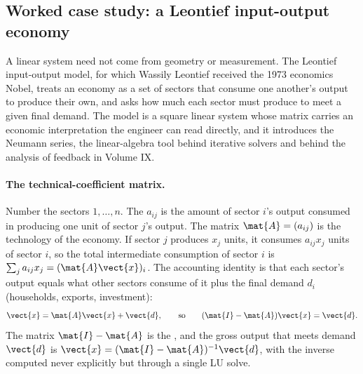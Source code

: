

\subsection{Worked case study: a Leontief input-output economy}

A linear system need not come from geometry or measurement. The
Leontief input-output model, for which Wassily Leontief received the
1973 economics Nobel, treats an economy as a set of sectors that
consume one another's output to produce their own, and asks how much
each sector must produce to meet a given final demand. The model is a
square linear system whose matrix carries an economic interpretation
the engineer can read directly, and it introduces the Neumann series,
the linear-algebra tool behind iterative solvers and behind the
analysis of feedback in Volume IX.

\paragraph{The technical-coefficient matrix.}
Number the sectors $1, \ldots, n$. The 
$a_{ij}$ is the amount of sector $i$'s output consumed in producing
one unit of sector $j$'s output. The matrix $\mat{A} = (a_{ij})$ is
the technology of the economy. If sector $j$ produces $x_{j}$ units,
it consumes $a_{ij}x_{j}$ units of sector $i$, so the total
intermediate consumption of sector $i$ is $\sum_{j} a_{ij}x_{j} =
(\mat{A}\vect{x})_{i}$. The accounting identity is that each sector's
output equals what other sectors consume of it plus the final demand
$d_{i}$ (households, exports, investment):
\[
\vect{x} = \mat{A}\vect{x} + \vect{d}, \qquad\text{so}\qquad
(\mat{I} - \mat{A})\vect{x} = \vect{d}.
\]
The matrix $\mat{I} - \mat{A}$ is the , and
the gross output that meets demand $\vect{d}$ is $\vect{x} = (\mat{I}
- \mat{A})^{-1}\vect{d}$, with the inverse computed never explicitly
but through a single LU solve.

